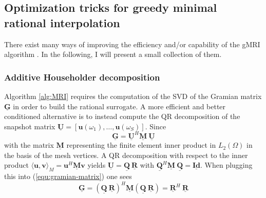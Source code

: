 \documentclass[11pt, a4paper]{article}
\begin{document}
\subsection{Optimization tricks for greedy minimal rational interpolation}
\label{subsec:optimization}

There exist many ways of improving the efficiency and/or capability of the
\acrshort{gMRI} algorithm \cite{davidePHD}. In the following, I will present
a small collection of them.

\subsubsection{Additive Householder decomposition}
\label{subsubsec:householder}

Algorithm \ref{alg:MRI} requires the computation of the \acrfull{SVD}
of the Gramian matrix $\mathbf{\underline{G}}$ in order to build the rational
surrogate. A more efficient and better conditioned \cite{davidePHD} alternative is to instead compute
the QR decomposition of the snapshot matrix $\mathbf{\underline{U}} = [\mathbf{u}(\omega_1), \dots, \mathbf{u}(\omega_S)]$.
Since
\begin{equation}
    \mathbf{\underline{G}} = \mathbf{\underline{U}}^H \mathbf{\underline{M}}~\mathbf{\underline{U}} \label{equ:gramian-matrix}
\end{equation}
with the matrix $\mathbf{\underline{M}}$ representing the finite element 
inner product in $L_2(\Omega)$ in the basis of the mesh vertices.
A QR decomposition with respect to the inner product
$\langle \mathbf{u}, \mathbf{v} \rangle_M = \mathbf{u}^H \mathbf{\underline{M}} \mathbf{v}$
yields $\mathbf{\underline{U}} = \mathbf{\underline{Q}}~\mathbf{\underline{R}}$
with $\mathbf{\underline{Q}}^H \mathbf{\underline{M}}~\mathbf{\underline{Q}} = \mathbf{\underline{Id}}$.
When plugging this into (\ref{equ:gramian-matrix}) one sees
\begin{equation}
    \mathbf{\underline{G}} = (\mathbf{\underline{Q}}~\mathbf{\underline{R}})^H \mathbf{\underline{M}} 
    (\mathbf{\underline{Q}}~\mathbf{\underline{R}}) = \mathbf{\underline{R}}^H~\mathbf{\underline{R}}
    \label{equ:gramian-QR}
\end{equation}
\end{document}
